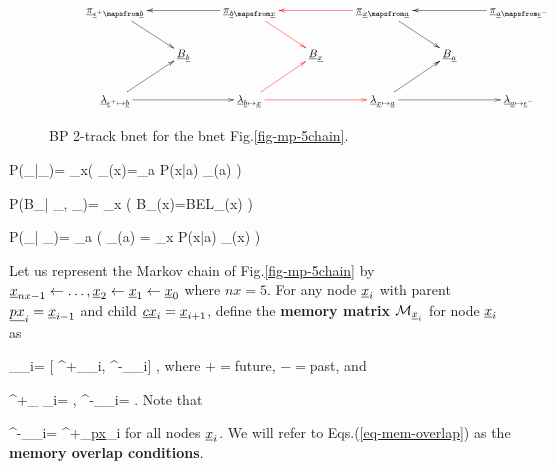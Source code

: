 \begin{figure}[h!]
$$\xymatrix{
&\ul{\pi}_{\rveps^+\ldart\rvb}\ar[dr]
&&\ul{\pi}_{\rvb\ldart\rvx}\ar[ll]\ar@[red][dr]
&&\ul{\pi}_{\rvx\ldart\rva}\ar@[red][ll]\ar[dr]
&&\ul{\pi}_{\rva\ldart\rveps^-}\ar[ll]
\\
&&\rvB_\rvb
&&\rvB_\rvx
&&\rvB_\rva
\\
&\ul{\lam}_{\rveps^+\rdart\rvb}\ar[rr]\ar[ur]
&&\ul{\lam}_{\rvb\rdart\rvx}\ar@[red][rr]\ar@[red][ur]
&&\ul{\lam}_{\rvx\rdart\rva}\ar[rr]\ar[ur]
&&\ul{\lam}_{\rva\rdart\rveps^-}
}$$
\caption{BP 2-track bnet for the bnet
Fig.\ref{fig-mp-5chain}.}
\label{fig-BEL-4pi}
\end{figure}


\beq\color{blue}
P(\pi_{\rvb\ldart\rvx}|\pi_{\rvx\ldart\rva})=
\prod_{x}\indi\left(
\pi_{\rvb\ldart\rvx}(x)=\sum_a P(x|a)
\pi_{\rvx\ldart\rva}(a)
\right)
\label{eq-pr-pi-bar-pi}
\eeq

\beq\color{blue}
P(B_\rvx|
\pi_{\rvb\ldart \rvx},
\lam_{\rvb\rdart \rvx})=
\prod_x
\indi\left(
B_\rvx(x)=BEL_\rvx(x)
\right)
\eeq

\beq\color{blue}
P(\lam_{\rvx\rdart \rva}|
\lam_{\rvb\rdart \rvx})=
\prod_{a}
\indi\left(
\lam_{\rvx\rdart \rva}(a)
=
\sum_x P(x|a)
\lam_{\rvb\rdart \rvx}(x)
\right)
\label{eq-pr-lam-bar-lam}
\eeq

Let us represent the Markov
chain of Fig.\ref{fig-mp-5chain}
by
${\underline{x}}_{nx-1}
\leftarrow \ldots, {\underline{x}}_2\leftarrow {\underline{x}}_1\leftarrow {\underline{x}}_0$
where $nx=5$.
For any node 
${\underline{x}}_i$
with
parent $\underline{px}_i={\underline{x}}_{i-1}$
and child $\underline{cx}_i={\underline{x}}_{i+1}$, 
define
the {\bf memory matrix}
${\cal M}_{{\underline{x}}_i}$
for node ${\underline{x}}_i$
as

\beq
\calm_{\rvx_i}=
[
\calm^+_{\rvx_i},
\calm^-_{\rvx_i}]
\;,
\eeq
where $+=$future, $-=$past, and 

\beq
\calm^+_{ \rvx_i}=
\;, 
\;\;\;
\calm^-_{\rvx_i}=
\;.
\eeq 
Note that

\beq
\calm^-_{\rvx_i}=
\calm^+_{\ul{px}_i}
\label{eq-mem-overlap}
\eeq
for all nodes ${\underline{x}}_i$.
We will refer to
Eqs.(\ref{eq-mem-overlap}) as
the {\bf memory overlap
conditions}.

